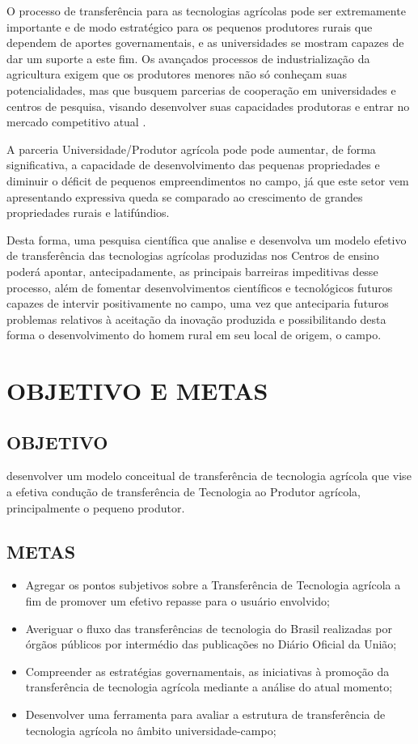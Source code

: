 O processo de transferência para as tecnologias agrícolas pode ser extremamente importante e de modo estratégico para os pequenos produtores rurais que dependem de aportes governamentais, e as universidades se mostram capazes de dar um suporte a este fim. Os avançados processos de industrialização da agricultura exigem que os produtores menores não só conheçam suas potencialidades, mas que busquem parcerias de cooperação em universidades e centros de pesquisa, visando desenvolver suas capacidades produtoras e entrar no mercado competitivo atual \cite{silva_modelo_2016}.

A parceria Universidade/Produtor agrícola pode pode aumentar, de forma
significativa, a capacidade de desenvolvimento das pequenas propriedades e diminuir o déficit de pequenos empreendimentos no campo, já que este setor vem apresentando expressiva queda se comparado ao crescimento de grandes propriedades rurais e latifúndios. 



Desta forma, uma pesquisa científica que analise e desenvolva um modelo efetivo de transferência das tecnologias agrícolas produzidas nos Centros de ensino poderá apontar, antecipadamente, as principais barreiras impeditivas desse processo, além de fomentar desenvolvimentos científicos e tecnológicos futuros capazes de intervir positivamente no campo, uma vez que anteciparia futuros problemas relativos à aceitação da inovação produzida e possibilitando desta forma o desenvolvimento do homem rural em seu local de origem, o campo.

\section{OBJETIVO E METAS}

\subsection{OBJETIVO}
desenvolver um modelo conceitual de transferência de tecnologia agrícola que vise a efetiva condução de transferência de Tecnologia ao Produtor agrícola, principalmente o pequeno produtor.
\subsection{METAS}

\begin{itemize}
\item{Agregar os pontos subjetivos sobre a Transferência de Tecnologia agrícola a fim de promover um efetivo repasse para o usuário envolvido;}
\item {Averiguar o fluxo das transferências de tecnologia do Brasil realizadas por órgãos públicos por intermédio das publicações no Diário Oficial da União;}
\item {Compreender as estratégias governamentais, as iniciativas à promoção da transferência de tecnologia agrícola mediante a análise do atual momento;}
\item {Desenvolver uma ferramenta para avaliar a estrutura de transferência de
tecnologia agrícola no âmbito universidade-campo;}
\end{itemize}


